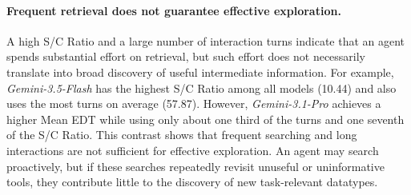

\paragraph{Frequent retrieval does not guarantee effective exploration.}
A high S/C Ratio and a large number of interaction turns indicate that an agent spends substantial effort on retrieval, but such effort does not necessarily translate into broad discovery of useful intermediate information.
For example, \textit{Gemini-3.5-Flash} has the highest S/C Ratio among all models (10.44) and also uses the most turns on average (57.87).
However, \textit{Gemini-3.1-Pro} achieves a higher Mean EDT while using only about one third of the turns and one seventh of the S/C Ratio.
This contrast shows that frequent searching and long interactions are not sufficient for effective exploration.
An agent may search proactively, but if these searches repeatedly revisit unuseful or uninformative tools, they contribute little to the discovery of new task-relevant datatypes.




